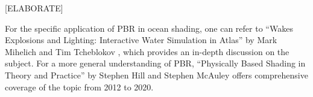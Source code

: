 [ELABORATE]

For the specific application of PBR in ocean shading, one can refer to “Wakes Explosions and Lighting: Interactive Water Simulation in Atlas” by Mark Mihelich and Tim Tcheblokov \cite{mark2021}, which provides an in-depth discussion on the subject. For a more general understanding of PBR, “Physically Based Shading in Theory and Practice” by Stephen Hill and Stephen McAuley \cite{stephan2012} offers comprehensive coverage of the topic from 2012 to 2020.









